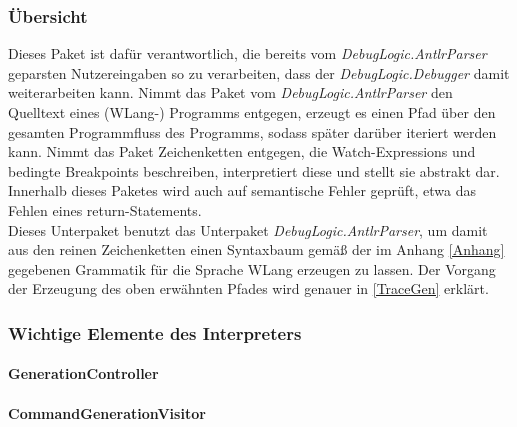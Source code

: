 \documentclass[parskip=full]{scrartcl}
\begin{document}
\subsubsection{Übersicht}
Dieses Paket ist dafür verantwortlich, die bereits vom \textit{DebugLogic.AntlrParser}  geparsten Nutzereingaben so zu verarbeiten, dass der \textit{DebugLogic.Debugger} damit weiterarbeiten kann. Nimmt das Paket vom \textit{DebugLogic.AntlrParser} den Quelltext eines (WLang-) Programms entgegen, erzeugt es einen Pfad über den gesamten Programmfluss des Programms, sodass später darüber iteriert werden kann. Nimmt das Paket Zeichenketten entgegen, die Watch-Expressions und bedingte Breakpoints beschreiben, interpretiert diese und stellt sie abstrakt dar.
Innerhalb dieses Paketes wird auch auf semantische Fehler geprüft, etwa das Fehlen eines return-Statements.\\
Dieses Unterpaket benutzt das Unterpaket \textit{DebugLogic.AntlrParser}, um damit aus den reinen Zeichenketten einen Syntaxbaum gemäß der im Anhang \ref{Anhang} gegebenen Grammatik für die Sprache WLang erzeugen zu lassen.
Der Vorgang der Erzeugung des oben erwähnten Pfades wird genauer in \ref{TraceGen} erklärt.
\subsubsection{Wichtige Elemente des Interpreters}
\paragraph{GenerationController}
\paragraph{CommandGenerationVisitor}
\end{document}
